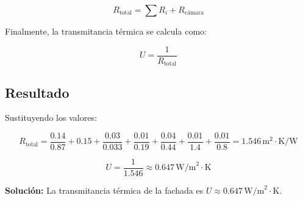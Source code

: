 \documentclass{article}
\begin{document}
$$
R_\text{total} = \sum R_i + R_\text{cámara}
$$

Finalmente, la transmitancia térmica se calcula como:

$$
U = \frac{1}{R_\text{total}}
$$

\subsection*{Resultado}

Sustituyendo los valores:

$$
R_\text{total} = \frac{0.14}{0.87} + 0.15 + \frac{0.03}{0.033} + \frac{0.01}{0.19} + \frac{0.04}{0.44} + \frac{0.01}{1.4} + \frac{0.01}{0.8} = 1.546 \, \text{m}^2 \cdot \text{K/W}
$$

$$
U = \frac{1}{1.546} \approx 0.647 \, \text{W/m}^2 \cdot \text{K}
$$

\textbf{Solución:} La transmitancia térmica de la fachada es $U \approx 0.647 \, \text{W/m}^2 \cdot \text{K}$.
\end{document}
